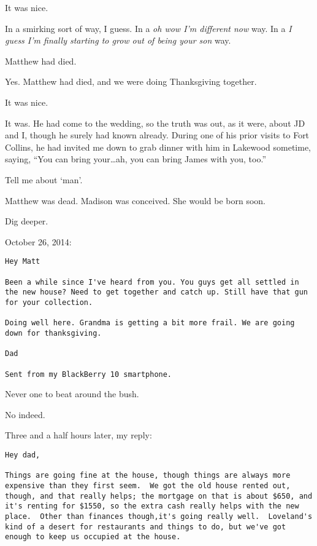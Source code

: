 \begin{paracol}{2}
\begin{leftcolumn}
\begin{ally}
It was nice.
\end{ally}
In a smirking sort of way, I guess. In a \emph{oh wow I'm different now} way. In a \emph{I guess I'm finally starting to grow out of being your son} way.

\begin{ally}
Matthew had died.
\end{ally}
Yes. Matthew had died, and we were doing Thanksgiving together.

\begin{ally}
It was nice.
\end{ally}
It was. He had come to the wedding, so the truth was out, as it were, about JD and I, though he surely had known already. During one of his prior visits to Fort Collins, he had invited me down to grab dinner with him in Lakewood sometime, saying, ``You can bring your\ldots{}ah, you can bring James with you, too.''

\begin{ally}
Tell me about `man'.
\end{ally}
Matthew was dead. Madison was conceived. She would be born soon.

\begin{ally}
Dig deeper.
\end{ally}
\newpage

October 26, 2014:

\begin{verbatim}
Hey Matt

Been a while since I've heard from you. You guys get all settled in the new house? Need to get together and catch up. Still have that gun for your collection.

Doing well here. Grandma is getting a bit more frail. We are going down for thanksgiving.

Dad

Sent from my BlackBerry 10 smartphone.
\end{verbatim}

\begin{ally}
Never one to beat around the bush.
\end{ally}
No indeed.

Three and a half hours later, my reply:

\begin{verbatim}
Hey dad,

Things are going fine at the house, though things are always more expensive than they first seem.  We got the old house rented out, though, and that really helps; the mortgage on that is about $650, and it's renting for $1550, so the extra cash really helps with the new place.  Other than finances though,it's going really well.  Loveland's kind of a desert for restaurants and things to do, but we've got enough to keep us occupied at the house.


\end{verbatim}
\end{leftcolumn}
\end{paracol}
